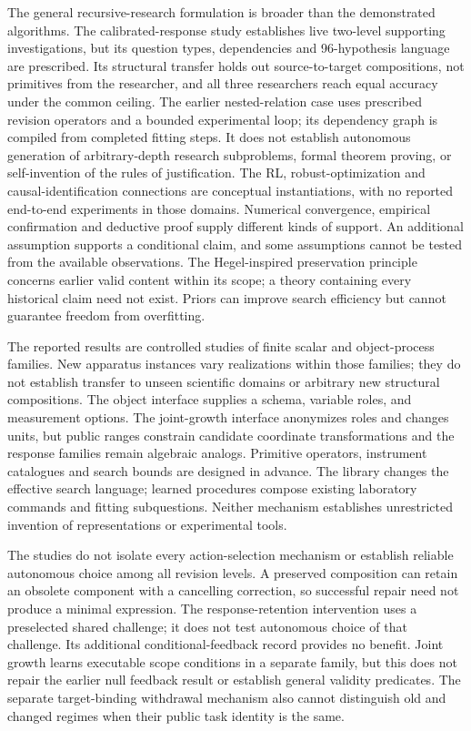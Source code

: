 \documentclass[twoside,11pt]{article}
\begin{document}
The general recursive-research formulation is broader than the demonstrated algorithms. The calibrated-response study establishes live two-level supporting investigations, but its question types, dependencies and 96-hypothesis language are prescribed. Its structural transfer holds out source-to-target compositions, not primitives from the researcher, and all three researchers reach equal accuracy under the common ceiling. The earlier nested-relation case uses prescribed revision operators and a bounded experimental loop; its dependency graph is compiled from completed fitting steps. It does not establish autonomous generation of arbitrary-depth research subproblems, formal theorem proving, or self-invention of the rules of justification. The RL, robust-optimization and causal-identification connections are conceptual instantiations, with no reported end-to-end experiments in those domains. Numerical convergence, empirical confirmation and deductive proof supply different kinds of support. An additional assumption supports a conditional claim, and some assumptions cannot be tested from the available observations. The Hegel-inspired preservation principle concerns earlier valid content within its scope; a theory containing every historical claim need not exist. Priors can improve search efficiency but cannot guarantee freedom from overfitting.


The reported results are controlled studies of finite scalar and object-process
families. New apparatus instances vary realizations within those families;
they do not establish transfer to unseen scientific domains or arbitrary new
structural compositions. The object interface supplies a schema, variable roles,
and measurement options. The joint-growth interface anonymizes roles and changes
units, but public ranges constrain candidate coordinate transformations and the
response families remain algebraic analogs. Primitive operators, instrument
catalogues and search bounds are designed in advance. The library changes the
effective search language; learned procedures compose existing laboratory
commands and fitting subquestions. Neither mechanism establishes unrestricted
invention of representations or experimental tools.


The studies do not isolate every action-selection mechanism or establish reliable
autonomous choice among all revision levels. A preserved composition can retain
an obsolete component with a cancelling correction, so successful repair need
not produce a minimal expression. The response-retention intervention uses a
preselected shared challenge; it does not test autonomous choice of that challenge.
Its additional conditional-feedback record provides no benefit. Joint growth
learns executable scope conditions in a separate family, but this does not repair
the earlier null feedback result or establish general validity predicates. The
separate target-binding withdrawal mechanism also cannot distinguish old and
changed regimes when their public task identity is the same.
\end{document}
